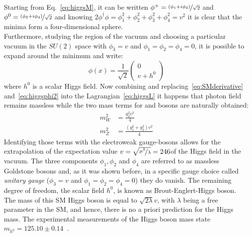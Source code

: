 Starting from Eq.~\ref{eq:higgsM}, it can be written $\phi^+=\nicefrac{(\phi_1 + i\phi_2)}{\sqrt{2}}$ and $\phi^0=\nicefrac{(\phi_3 + i\phi_4)}{\sqrt{2}}$ and knowing $2\phi^\dag \phi = \phi^2_1+\phi^2_2+ \phi^2_3+ \phi^2_4 = v^2$ it is clear that the minima form a four-dimensional sphere.\\
Furthermore, studying the region of the vacuum and choosing a particular vacuum in the $SU(2)$ space with $\phi_3 = v$ and $\phi_1=\phi_2=\phi_4=0$, it is possible to expand around the minimum and write:
\begin{equation}
\label{eq:higgsphi2}
\phi(x) = \frac{1}{\sqrt{2}}\begin{pmatrix}
0\\
v+ h^0
\end{pmatrix}
\end{equation}
where $h^0$ is a scalar Higgs field. Now combining and replacing~\ref{eq:SMderivative} and~\ref{eq:higgsphi2} into the Lagrangian~\ref{eq:higgsL} it happens that photon field remains massless while the two mass terms for \PW and \PZ bosons are naturally obtained:
\begin{align}
m^2_W &= \frac{g_2^2v^2}{4}\label{eq:massW}\\
m^2_Z &= \frac{(g_1^2+g_2^2)v^2}{4}\label{eq:massZ}
\end{align}
Identifying those terms with the electroweak gauge-bosons allows for the extrapolation of the expectation value $v = \sqrt{\nicefrac{\mu^2}{\lambda}} = 246$\GeV of the Higgs field in the vacuum.
The three components $\phi_1,\phi_2$ and $\phi_4$ are referred to as massless Goldstone bosons and, as it was shown before, in a specific gauge choice called \emph{unitary gauge} ($\phi_3 = v$ and $\phi_1=\phi_2=\phi_4=0$) they do vanish. The remaining degree of freedom, the scalar field $h^0$, is known as Brout-Englert-Higgs boson. The mass of this SM Higgs boson is equal to $\sqrt{2\lambda}v$, with $\lambda$ being a free parameter in the SM, and
hence, there is no a priori prediction for the Higgs mass. The experimental measurements of the Higgs boson mass state  $m_{h^0}=125.10\pm0.14$\GeV~\cite{pdgw}. 

